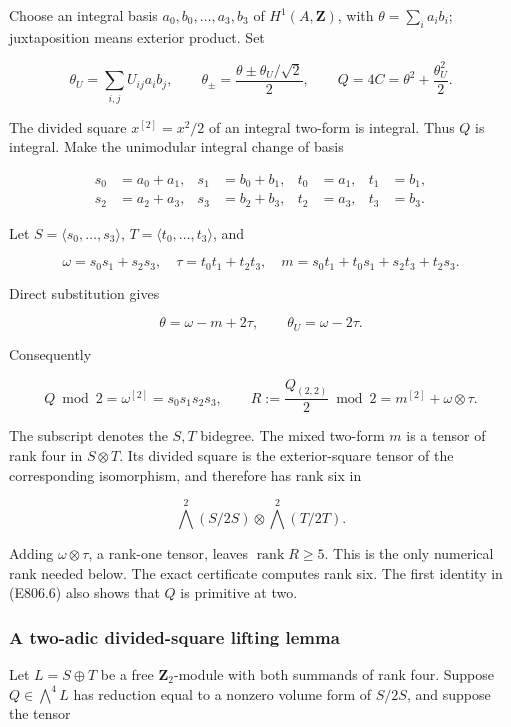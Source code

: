 Choose an integral basis \(a_0,b_0,\ldots,a_3,b_3\) of
\(H^1(A,\mathbf Z)\), with \(\theta=\sum_i a_i b_i\); juxtaposition
means exterior product. Set

\[
 \theta_U=\sum_{i,j}U_{ij}a_i b_j,\qquad
 \theta_\pm=\frac{\theta\pm\theta_U/\sqrt2}{2},\qquad
 Q=4C=\theta^2+\frac{\theta_U^2}{2}.
 \tag{E806.4}
\]

The divided square \(x^{[2]}=x^2/2\) of an integral two-form is
integral. Thus \(Q\) is integral. Make the unimodular integral change of
basis

\[
 \begin{aligned}
 s_0&=a_0+a_1,&s_1&=b_0+b_1,&t_0&=a_1,&t_1&=b_1,\\
 s_2&=a_2+a_3,&s_3&=b_2+b_3,&t_2&=a_3,&t_3&=b_3 .
 \end{aligned}
\]

Let \(S=\langle s_0,\ldots,s_3\rangle\),
\(T=\langle t_0,\ldots,t_3\rangle\), and

\[
 \omega=s_0s_1+s_2s_3,\quad
 \tau=t_0t_1+t_2t_3,\quad
 m=s_0t_1+t_0s_1+s_2t_3+t_2s_3.
\]

Direct substitution gives

\[
 \theta=\omega-m+2\tau,\qquad
 \theta_U=\omega-2\tau.
 \tag{E806.5}
\]

Consequently

\[
 Q\bmod2=\omega^{[2]}=s_0s_1s_2s_3,\qquad
 R:=\frac{Q_{(2,2)}}2\bmod2
    =m^{[2]}+\omega\otimes\tau .
 \tag{E806.6}
\]

The subscript denotes the \(S,T\) bidegree. The mixed two-form \(m\) is
a tensor of rank four in \(S\otimes T\). Its divided square is the
exterior-square tensor of the corresponding isomorphism, and therefore
has rank six in

\[
 \bigwedge^2(S/2S)\otimes\bigwedge^2(T/2T).
\]

Adding \(\omega\otimes\tau\), a rank-one tensor, leaves
\(\operatorname{rank}R\ge5\). This is the only numerical rank needed
below. The exact certificate computes rank six. The first identity in
(E806.6) also shows that \(Q\) is primitive at two.

\subsubsection{A two-adic divided-square lifting
lemma}\label{a-two-adic-divided-square-lifting-lemma}

Let \(L=S\oplus T\) be a free \(\mathbf Z_2\)-module with both summands
of rank four. Suppose \(Q\in\bigwedge^4L\) has reduction equal to a
nonzero volume form of \(S/2S\), and suppose the tensor


